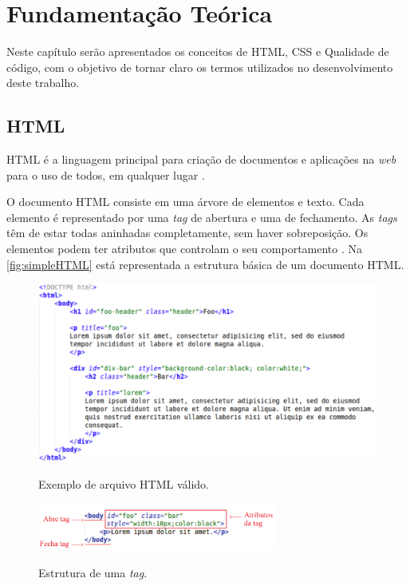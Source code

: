 %
%

\chapter{Fundamentação Teórica}
\label{chap:fund-teor}

Neste capítulo serão apresentados os conceitos de HTML, CSS e Qualidade de código, com o objetivo de tornar claro os termos utilizados no desenvolvimento deste trabalho.

\section{HTML}
\label{sec:html}
HTML é a linguagem principal para criação de documentos e aplicações na \textit{web} para o uso de todos, em qualquer lugar \cite{W3Chtml2015}.

O documento HTML consiste em uma árvore de elementos e texto. Cada elemento é representado por uma \textit{tag} de abertura e uma de fechamento. As \textit{tags} têm de estar todas aninhadas completamente, sem haver sobreposição. Os elementos podem ter atributos que controlam o seu comportamento \cite{HTMLspec2014}. Na \autoref{fig:simpleHTML} está representada a estrutura básica de um documento HTML.

\begin{figure}[!htb]
	\centering
	\caption{Exemplo de arquivo HTML válido.}
	\includegraphics[width=1\textwidth]{./04-figuras/html_simples}
	\label{fig:simpleHTML}
\end{figure}

\begin{figure}[!htb]
	\centering
	\caption{Estrutura de uma \textit{tag}.}
	\includegraphics[width=0.7\textwidth]{./04-figuras/tag_element_attr_marked}
	\label{fig:tagStruct}
\end{figure}

